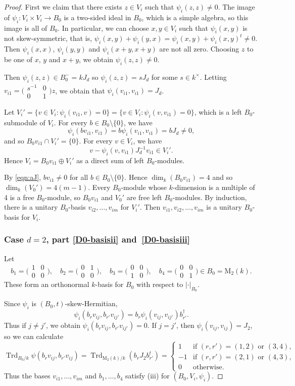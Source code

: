 \documentclass[11pt]{article}
\numberwithin{equation}{section}
\newcommand{\rM}{\mathrm{M}}
\DeclareMathOperator{\Trd}{Trd}
\newcommand{\abs}[1]{\lvert #1 \rvert}
\newcommand{\fullsmallmatrix}[4]{\bigl( \begin{smallmatrix} #1 & #2 \\ #3 & #4 \end{smallmatrix} \bigr)}
\begin{document}
\begin{proof}
First we claim that there exists $z \in V_i$ such that $\psi_i(z,z) \neq 0$.
The image of $\psi_i \colon V_i \times V_i \to B_0$ is a two-sided ideal in $B_0$, which is a simple algebra, so this image is all of $B_0$.
In particular, we can choose $x,y \in V_i$ such that $\psi_i(x,y)$ is not skew-symmetric, that is, $\psi_i(x,y) + \psi_i(y,x) = \psi_i(x,y) + \psi_i(x,y)^t \neq 0$.
Then $\psi_i(x,x)$, $\psi_i(y,y)$ and $\psi_i(x+y,x+y)$ are not all zero.
Choosing $z$ to be one of $x$, $y$ and $x+y$, we obtain $\psi_i(z,z) \neq 0$.

Then $\psi_i(z,z) \in B_0^- = k J_d$ so $\psi_i(z,z) = s J_d$ for some $s \in k^\times$.
Letting $v_{i1} = \fullsmallmatrix{s^{-1}}{0}{0}{1}z$, we obtain that $\psi_i(v_{i1}, v_{i1}) = J_d$.

Let $V_i' = \{ v \in V_i : \psi_i(v_{i1}, v) = 0 \} = \{ v \in V_i : \psi_i(v, v_{i1}) = 0 \}$, which is a left $B_0$-submodule of $V_i$.
For every $b \in B_0 \setminus \{0\}$, we have
\begin{equation} \label{eqn:aJ}
\psi_i(bv_{i1}, v_{i1}) = b\psi_i(v_{i1}, v_{i1}) = bJ_d \neq 0,
\end{equation}
and so $B_0v_{i1} \cap V_i' = \{ 0 \}$.
For every $v \in V_i$, we have
\[
v - \psi_i(v, v_{i1}) J_d^{-1} v_{i1} \in V_i'.
\]
Hence $V_i = B_0v_{i1} \oplus V_i'$ as a direct sum of left $B_0$-modules.

By \eqref{eqn:aJ}, $bv_{i1} \neq 0$ for all $b \in B_0 \setminus \{0\}$.
Hence $\dim_k(B_0v_{i1}) = 4$ and so $\dim_k(V_0') = 4(m-1)$.
Every $B_0$-module whose $k$-dimension is a multiple of 4 is a free $B_0$-module,
so $B_0v_{i1}$ and $V_0'$ are free left $B_0$-modules.
By induction, there is a unitary $B_0$-basis $v_{i2}, \dotsc, v_{im}$ for $V_i'$.
Then $v_{i1}, v_{i2}, \dotsc, v_{im}$ is a unitary $B_0$-basis for $V_i$.

\subsubsection*{Case $d=2$, part \eqref{D0-basisii} and~\eqref{D0-basisiii}}
Let
\[
b_1 = \fullsmallmatrix{1}{0}{0}{0},
\quad b_2 = \fullsmallmatrix{0}{1}{0}{0},
\quad b_3 = \fullsmallmatrix{0}{0}{1}{0},
\quad b_4 = \fullsmallmatrix{0}{0}{0}{1} \in B_0 = \rM_2(k).
\]
These form an orthonormal $k$-basis for $B_0$ with respect to $\abs{\cdot}_{B_0}$.

Since $\psi_i$ is $(B_0,t)$-skew-Hermitian,
\[
\psi_i(b_rv_{ij}, b_{r'}v_{ij'}) = b_r\psi_i(v_{ij}, v_{ij'})b_{r'}^\dag.
\]
Thus if $j \neq j'$, we obtain $\psi_i(b_rv_{ij}, b_{r'}v_{ij'}) = 0$.
If $j = j'$, then $\psi_i(v_{ij}, v_{ij}) = J_2$, so we can calculate
\[
\Trd_{B_0/k} \psi(b_rv_{ij}, b_{r'}v_{ij}) = \Trd_{\rM_2(k)/k}(b_rJ_2b_{r'}^t)
= \begin{cases}
1 &\text{if } (r,r') = (1,2) \text{ or } (3,4),
\\ -1 &\text{if } (r,r') = (2,1) \text{ or } (4,3),
\\ 0 &\text{otherwise}.
\end{cases}
\]
Thus the bases $v_{i1}, \dotsc, v_{im}$ and $b_1, \dotsc, b_4$ satisfy (iii) for $(B_0, V_i, \psi_i)$.
\end{proof}
\end{document}
